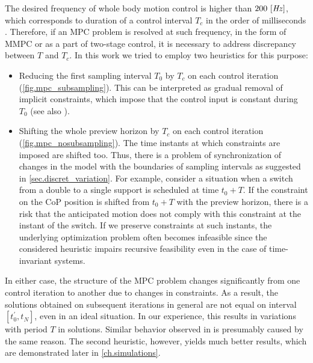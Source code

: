The desired frequency of whole body motion control is higher than
$200~[\mathit{Hz}]$, which corresponds to duration of a control interval $T_c$ in
the order of milliseconds \cite{Kuindersma2014icra, Herzog2015auro,
Saab2013tro}. Therefore, if an \ac{MPC} problem is resolved at such frequency,
in the form of \ac{MMPC} or as a part of two-stage control, it is necessary to
address discrepancy between $T$ and $T_c$. In this work we tried to employ two
heuristics for this purpose:
%
\begin{itemize}
    \item Reducing the first sampling interval $T_0$ by $T_c$ on each control
        iteration (\cref{fig.mpc_subsampling}). This can be interpreted as
        gradual removal of implicit  constraints, which
        impose that the control input is constant during $T_0$ (see also
        \cite{Cagienard2007jpc}).

    \item Shifting the whole preview horizon by $T_c$ on each control iteration
        (\cref{fig.mpc_nosubsampling}). The time instants at which constraints
        are imposed are shifted too. Thus, there is a problem of
        synchronization of changes in the model with the boundaries of sampling
        intervals as suggested in \cref{sec.discret_variation}. For example,
        consider a situation when a switch from a double to a single support is
        scheduled at time $t_0 + T$. If the constraint on the \ac{CoP} position
        is shifted from $t_0 + T$ with the preview horizon, there is a risk
        that the anticipated motion does not comply with this constraint at the
        instant of the switch. If we preserve constraints at such instants, the
        underlying optimization problem often becomes infeasible since the
        considered heuristic impairs recursive feasibility even in the case of
        time-invariant systems.
\end{itemize}
%
In either case, the structure of the \ac{MPC} problem changes significantly
from one control iteration to another due to changes in constraints. As a
result, the solutions obtained on subsequent iterations in general are not
equal on interval $[t_0^{\prime}, t_N]$, even in an ideal situation. In our
experience, this results in variations with period $T$ in solutions. Similar
behavior observed in \cite{Henze2014iros} is presumably caused by the same
reason. The second heuristic, however, yields much better results, which are
demonstrated later in \cref{ch.simulations}.



